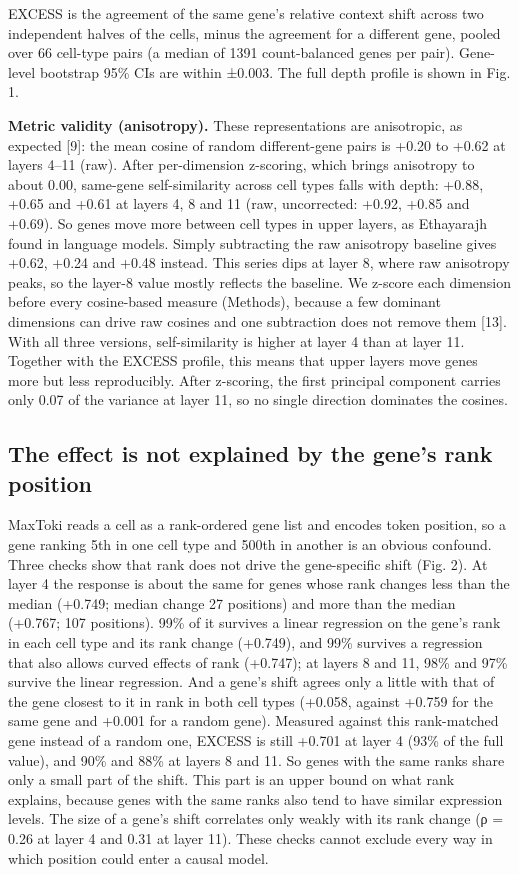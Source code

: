 \documentclass[
  11pt,
]{article}
\begin{document}
EXCESS is the agreement of the same gene's relative context shift across
two independent halves of the cells, minus the agreement for a different
gene, pooled over 66 cell-type pairs (a median of 1391 count-balanced
genes per pair). Gene-level bootstrap 95\% CIs are within ±0.003. The
full depth profile is shown in Fig. 1.

\textbf{Metric validity (anisotropy).} These representations are
anisotropic, as expected {[}9{]}: the mean cosine of random
different-gene pairs is +0.20 to +0.62 at layers 4--11 (raw). After
per-dimension z-scoring, which brings anisotropy to about 0.00,
same-gene self-similarity across cell types falls with depth: +0.88,
+0.65 and +0.61 at layers 4, 8 and 11 (raw, uncorrected: +0.92, +0.85
and +0.69). So genes move more between cell types in upper layers, as
Ethayarajh found in language models. Simply subtracting the raw
anisotropy baseline gives +0.62, +0.24 and +0.48 instead. This series
dips at layer 8, where raw anisotropy peaks, so the layer-8 value mostly
reflects the baseline. We z-score each dimension before every
cosine-based measure (Methods), because a few dominant dimensions can
drive raw cosines and one subtraction does not remove them {[}13{]}.
With all three versions, self-similarity is higher at layer 4 than at
layer 11. Together with the EXCESS profile, this means that upper layers
move genes more but less reproducibly. After z-scoring, the first
principal component carries only 0.07 of the variance at layer 11, so no
single direction dominates the cosines.

\subsection{The effect is not explained by the gene's rank
position}\label{the-effect-is-not-explained-by-the-genes-rank-position}

MaxToki reads a cell as a rank-ordered gene list and encodes token
position, so a gene ranking 5th in one cell type and 500th in another is
an obvious confound. Three checks show that rank does not drive the
gene-specific shift (Fig. 2). At layer 4 the response is about the same
for genes whose rank changes less than the median (+0.749; median change
27 positions) and more than the median (+0.767; 107 positions). 99\% of
it survives a linear regression on the gene's rank in each cell type and
its rank change (+0.749), and 99\% survives a regression that also
allows curved effects of rank (+0.747); at layers 8 and 11, 98\% and
97\% survive the linear regression. And a gene's shift agrees only a
little with that of the gene closest to it in rank in both cell types
(+0.058, against +0.759 for the same gene and +0.001 for a random gene).
Measured against this rank-matched gene instead of a random one, EXCESS
is still +0.701 at layer 4 (93\% of the full value), and 90\% and 88\%
at layers 8 and 11. So genes with the same ranks share only a small part
of the shift. This part is an upper bound on what rank explains, because
genes with the same ranks also tend to have similar expression levels.
The size of a gene's shift correlates only weakly with its rank change
(ρ = 0.26 at layer 4 and 0.31 at layer 11). These checks cannot exclude
every way in which position could enter a causal model.
\end{document}
